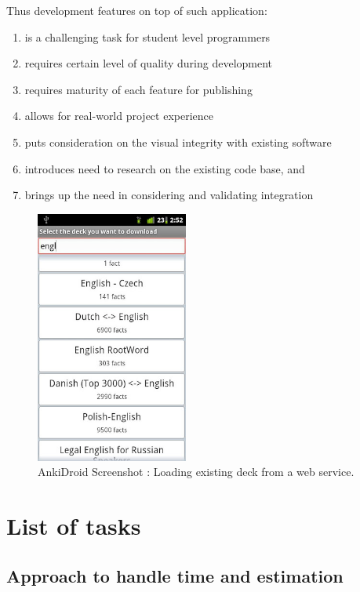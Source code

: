 \documentclass[a4paper,11pt,twoside]{article}
\begin{document}
Thus development features on top of such application:
\begin{enumerate}
  \item is a challenging task for student level programmers
  \item requires certain level of quality during development
  \item requires maturity of each feature for publishing
  \item allows for real-world project experience
  \item puts consideration on the visual integrity with existing software
  \item introduces need to research on the existing code base, and
  \item brings up the need in considering and validating integration
\end{enumerate}


\begin{figure}[t]
\centering
\label{fig:Downloddeck}
\includegraphics[width=5cm]{Screenshot3}
\caption{AnkiDroid Screenshot : Loading existing deck from a web service.}
\end{figure}




\section{List of tasks}

\subsection{Approach to handle time and estimation}
\end{document}
